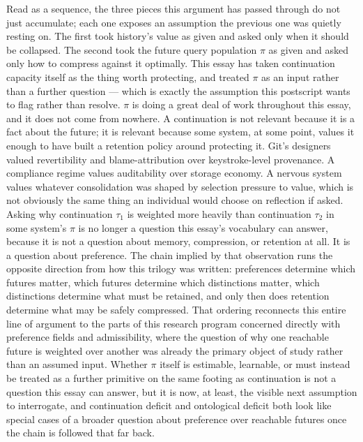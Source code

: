 \documentclass[11pt]{article}
\begin{document}
Read as a sequence, the three pieces this argument has passed through do not just accumulate; each one exposes an assumption the previous one was quietly resting on. The first took history's value as given and asked only when it should be collapsed. The second took the future query population $\pi$ as given and asked only how to compress against it optimally. This essay has taken continuation capacity itself as the thing worth protecting, and treated $\pi$ as an input rather than a further question --- which is exactly the assumption this postscript wants to flag rather than resolve. $\pi$ is doing a great deal of work throughout this essay, and it does not come from nowhere. A continuation is not relevant because it is a fact about the future; it is relevant because some system, at some point, values it enough to have built a retention policy around protecting it. Git's designers valued revertibility and blame-attribution over keystroke-level provenance. A compliance regime values auditability over storage economy. A nervous system values whatever consolidation was shaped by selection pressure to value, which is not obviously the same thing an individual would choose on reflection if asked. Asking why continuation $\tau_1$ is weighted more heavily than continuation $\tau_2$ in some system's $\pi$ is no longer a question this essay's vocabulary can answer, because it is not a question about memory, compression, or retention at all. It is a question about preference. The chain implied by that observation runs the opposite direction from how this trilogy was written: preferences determine which futures matter, which futures determine which distinctions matter, which distinctions determine what must be retained, and only then does retention determine what may be safely compressed. That ordering reconnects this entire line of argument to the parts of this research program concerned directly with preference fields and admissibility, where the question of why one reachable future is weighted over another was already the primary object of study rather than an assumed input. Whether $\pi$ itself is estimable, learnable, or must instead be treated as a further primitive on the same footing as continuation is not a question this essay can answer, but it is now, at least, the visible next assumption to interrogate, and continuation deficit and ontological deficit both look like special cases of a broader question about preference over reachable futures once the chain is followed that far back.
\end{document}
